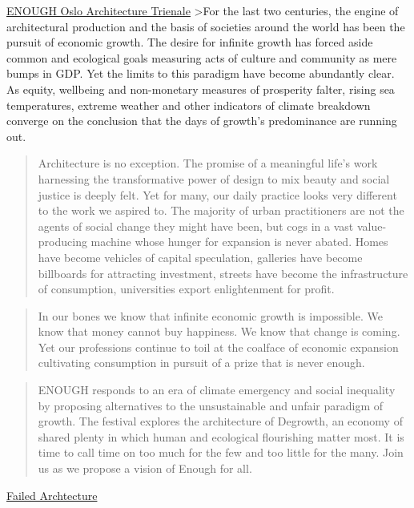 \documentclass[
]{book}
\begin{document}
\href{http://oslotriennale.no/en/aboutoat2019}{ENOUGH Oslo Architecture Trienale}
\textgreater For the last two centuries, the engine of architectural production and the basis of societies around the world has been the pursuit of economic growth. The desire for infinite growth has forced aside common and ecological goals measuring acts of culture and community as mere bumps in GDP. Yet the limits to this paradigm have become abundantly clear. As equity, wellbeing and non-monetary measures of prosperity falter, rising sea temperatures, extreme weather and other indicators of climate breakdown converge on the conclusion that the days of growth's predominance are running out.

\begin{quote}
Architecture is no exception. The promise of a meaningful life's work harnessing the transformative power of design to mix beauty and social justice is deeply felt. Yet for many, our daily practice looks very different to the work we aspired to. The majority of urban practitioners are not the agents of social change they might have been, but cogs in a vast value-producing machine whose hunger for expansion is never abated. Homes have become vehicles of capital speculation, galleries have become billboards for attracting investment, streets have become the infrastructure of consumption, universities export enlightenment for profit.
\end{quote}

\begin{quote}
In our bones we know that infinite economic growth is impossible. We know that money cannot buy happiness. We know that change is coming. Yet our professions continue to toil at the coalface of economic expansion cultivating consumption in pursuit of a prize that is never enough.
\end{quote}

\begin{quote}
ENOUGH responds to an era of climate emergency and social inequality by proposing alternatives to the unsustainable and unfair paradigm of growth. The festival explores the architecture of Degrowth, an economy of shared plenty in which human and ecological flourishing matter most. It is time to call time on too much for the few and too little for the many. Join us as we propose a vision of Enough for all.
\end{quote}

\href{https://failedarchitecture.com/degrowth-is-about-redistribution-by-design-not-by-collapse/}{Failed Archtecture}
\end{document}
